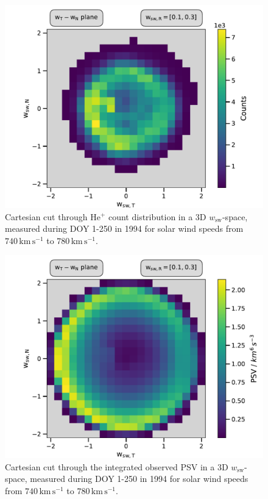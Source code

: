 \begin{figure}[h]
	\includegraphics[width=.85\textwidth]{Figures/cart_long_counts.pdf}
	\centering
	\caption{Cartesian cut through $\mathrm{He^{+}}$ count distribution in a 3D $w_\mathrm{sw}$-space, measured during DOY 1-250 in 1994 for solar wind speeds from $740 \, \mathrm{km\,s^{-1}}$ to $780 \, \mathrm{km\,s^{-1}}$.}
	\label{fig:counts_long}
\end{figure}
\begin{figure}[h]
	\includegraphics[width=.85\textwidth]{Figures/cart_long_norm.pdf}
	\centering
	\caption{Cartesian cut through the integrated observed PSV in a 3D $w_\mathrm{sw}$-space, measured during DOY 1-250 in 1994 for solar wind speeds from $740 \, \mathrm{km\,s^{-1}}$ to $780 \, \mathrm{km\,s^{-1}}$.}
	\label{fig:norm_long}
\end{figure}
